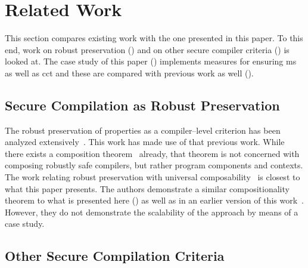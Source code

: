\documentclass[utf8,acmsmall,review,screen,dvipsnames]{acmart}
\begin{document}
\section{Related Work}\label{sec:relwork}

This section compares existing work with the one presented in this paper.
To this end, work on robust preservation () and on other secure compiler criteria () is looked at.
The case study of this paper () implements measures for ensuring \gls{ms} as well as \gls{cct} and these are compared with previous work as well ().

\subsection{Secure Compilation as Robust Preservation}\label{subsec:relw:seccomprtp}

The robust preservation of properties as a compiler--level criterion has been analyzed extensively~\cite{abate2019jour,patrignani2021rsc,abate2021extacc,patrignani2022universal,patrignani2019survey,kruse2022csc}.
This work has made use of that previous work.
While there exists a composition theorem~\cite{abate2019jour} already, that theorem is not concerned with composing robustly safe compilers, but rather program components and contexts.
The work relating robust preservation with universal composability~\cite{patrignani2022universal} is closest to what this paper presents.
The authors demonstrate a similar compositionality theorem to what is presented here () as well as in an earlier version of this work~\cite{kruse2022csc}.
However, they do not demonstrate the scalability of the approach by means of a case study.

\subsection{Other Secure Compilation Criteria}\label{subsec:relw:seccompcrit}
\end{document}
